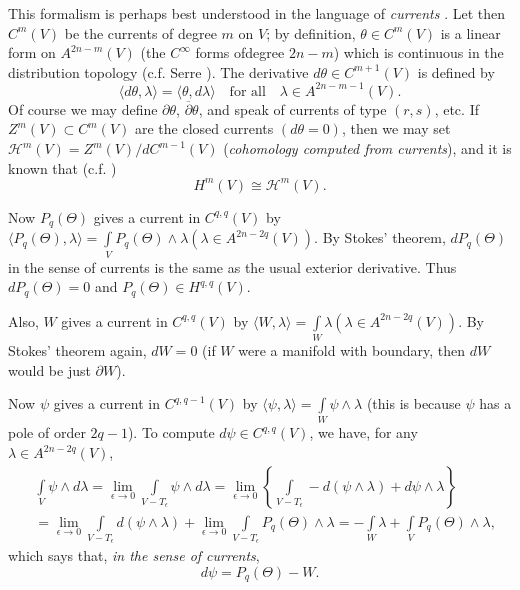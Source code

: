 This formalism is perhaps best understood in the language of {\em currents} \cite{art08-key14}. Let then $C^{m}(V)$ be the currents of degree $m$ on $V$; by definition, $\theta\in C^{m}(V)$ is a linear form on $A^{2n-m}(V)$ (the $C^{\infty}$ forms of\pageoriginale degree $2n-m$) which is continuous in the distribution topology (c.f. Serre \cite{art08-key21}). The derivative $d\theta\in C^{m+1}(V)$ is defined by
\begin{equation*}
\langle d\theta,\lambda\rangle =\langle \theta,d\lambda\rangle \text{~~ for all~~ } \lambda\in A^{2n-m-1}(V).\tag{A4.44}\label{art08-sec4-eqA4.44}
\end{equation*}
Of course we may define $\partial \theta$, $\overline{\partial}\theta$, and speak of currents of type $(r,s)$, etc. If $Z^{m}(V)\subset C^{m}(V)$ are the closed currents $(d\theta=0)$, then we may set $\mathscr{H}^{m}(V)=Z^{m}(V)/dC^{m-1}(V)$ ({\em cohomology computed from currents}), and it is known that (c.f. \cite{art08-key14})
\begin{equation*}
H^{m}(V)\cong \mathscr{H}^{m}(V).\tag{A4.45}\label{art08-sec4-eqA4.45}
\end{equation*}

Now $P_{q}(\Theta)$ gives a current in $C^{q,q}(V)$ by $\langle P_{q}(\Theta),\lambda\rangle=\int\limits_{V}P_{q}(\Theta)\wedge \lambda (\lambda\in A^{2n-2q}(V))$. By Stokes' theorem, $dP_{q}(\Theta)$ in the sense of currents is the same as the usual exterior derivative. Thus $dP_{q}(\Theta)=0$ and $P_{q}(\Theta)\in H^{q,q}(V)$.

Also, $W$ gives a current in $C^{q,q}(V)$ by $\langle W,\lambda\rangle=\int\limits_{W}\lambda(\lambda\in A^{2n-2q}(V))$. By Stokes' theorem again, $dW=0$ (if $W$ were a manifold with boundary, then $dW$ would be just $\partial W$).

Now $\psi$ gives a current in $C^{q,q-1}(V)$ by $\langle \psi,\lambda\rangle=\int\limits_{W}\psi\wedge\lambda$ (this is because $\psi$ has a pole of order $2q-1$). To compute $d\psi\in C^{q,q}(V)$, we have, for any $\lambda\in A^{2n-2q}(V)$,
\begin{align*}
& \int\limits_{V}\psi\wedge d\lambda=\lim\limits_{\epsilon\to 0}\int\limits_{V-T_{\epsilon}}\psi\wedge d\lambda=\lim\limits_{\epsilon\to 0}\left\{\int\limits_{V-T_{\epsilon}}-d(\psi\wedge\lambda)+d\psi\wedge\lambda\right\}\\[4pt]
&=\lim\limits_{\epsilon\to 0}\int\limits_{V-T_{\epsilon}}d(\psi\wedge\lambda)+\lim\limits_{\epsilon\to 0}\int\limits_{V-T_{\epsilon}}P_{q}(\Theta)\wedge\lambda=-\int\limits_{W}\lambda+\int\limits_{V}P_{q}(\Theta)\wedge\lambda,
\end{align*}
which says that, {\em in the sense of currents},
\begin{equation*}
d\psi=P_{q}(\Theta)-W.\tag{A4.45}\label{art08-sec4-eqA4.45}
\end{equation*}

